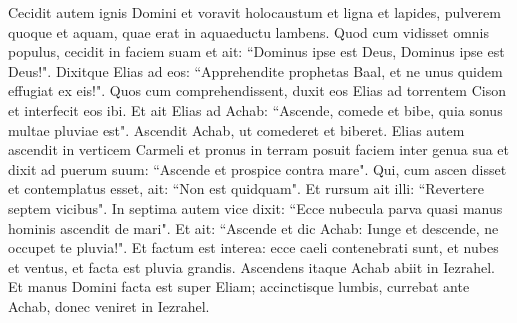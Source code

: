 \begin{biblechapter}
\verse Cecidit autem ignis Domini et voravit holocaustum et ligna et lapides, pulverem quoque et aquam, quae erat in aquaeductu lambens. 
\verse Quod cum vidisset omnis populus, cecidit in faciem suam et ait: “Dominus ipse est Deus, Dominus ipse est Deus!". 
\verse Dixitque Elias ad eos: “Apprehendite prophetas Baal, et ne unus quidem effugiat ex eis!". Quos cum comprehendissent, duxit eos Elias ad torrentem Cison et interfecit eos ibi. 
\verse Et ait Elias ad Achab: “Ascende, comede et bibe, quia sonus multae pluviae est". 
\verse Ascendit Achab, ut comederet et biberet. Elias autem ascendit in verticem Carmeli et pronus in terram posuit faciem inter genua sua 
\verse et dixit ad puerum suum: “Ascende et prospice contra mare". Qui, cum ascen disset et contemplatus esset, ait: “Non est quidquam". Et rursum ait illi: “Revertere septem vicibus". 
\verse In septima autem vice dixit: “Ecce nubecula parva quasi manus hominis ascendit de mari". Et ait: “Ascende et dic Achab: Iunge et descende, ne occupet te pluvia!". 
\verse Et factum est interea: ecce caeli contenebrati sunt, et nubes et ventus, et facta est pluvia grandis. Ascendens itaque Achab abiit in Iezrahel. 
\verse Et manus Domini facta est super Eliam; accinctisque lumbis, currebat ante Achab, donec veniret in Iezrahel. 
\end{biblechapter}

